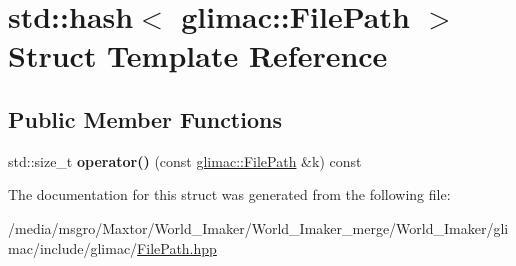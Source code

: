 \hypertarget{structstd_1_1hash_3_01glimac_1_1FilePath_01_4}{}\section{std\+:\+:hash$<$ glimac\+:\+:File\+Path $>$ Struct Template Reference}
\label{structstd_1_1hash_3_01glimac_1_1FilePath_01_4}
\subsection*{Public Member Functions}
\begin{DoxyCompactItemize}
\item 
\mbox{\label{structstd_1_1hash_3_01glimac_1_1FilePath_01_4_aef106b8bc300f85d943f47f631965d37}} 
std\+::size\+\_\+t {\bfseries operator()} (const \hyperlink{classglimac_1_1FilePath}{glimac\+::\+File\+Path} \&k) const
\end{DoxyCompactItemize}


The documentation for this struct was generated from the following file\+:\begin{DoxyCompactItemize}
\item 
/media/msgro/\+Maxtor/\+World\+\_\+\+Imaker/\+World\+\_\+\+Imaker\+\_\+merge/\+World\+\_\+\+Imaker/glimac/include/glimac/\hyperlink{FilePath_8hpp}{File\+Path.\+hpp}\end{DoxyCompactItemize}
